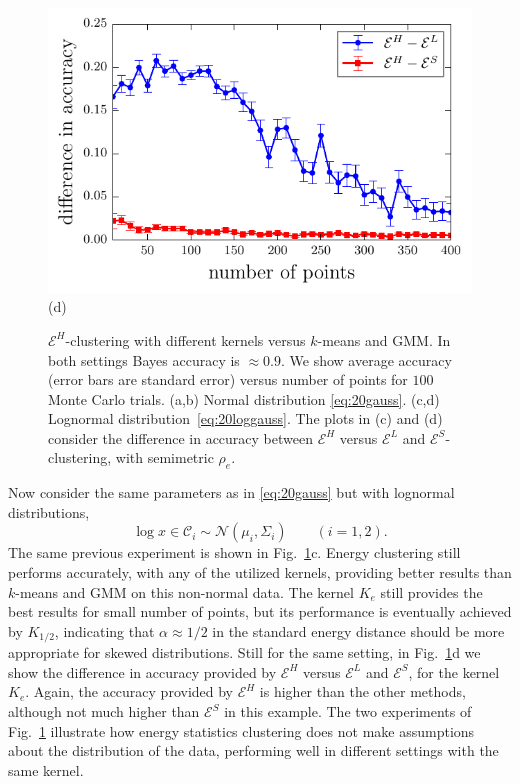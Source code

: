 \documentclass[aps,preprint,nofootinbib,floatfix]{revtex4-1}
\newcommand\kk{K}
\newcommand\C{{\mathcal{C}}}
\begin{document}
\begin{figure}
\begin{minipage}{0.49\textwidth}
\end{minipage}
\begin{minipage}{0.49\textwidth}
\centering
\includegraphics[width=1\textwidth]{lognormal_kernels_difference.pdf}\\[-1.0em]
(d)
\end{minipage}
\caption{
\label{fig:consist}
$\mathcal{E}^H$-clustering with different kernels versus
$k$-means and GMM. In both settings Bayes accuracy
is $\approx 0.9$. We show average accuracy (error bars are standard error)
versus number of points for $100$ Monte Carlo trials.
(a,b) Normal distribution \eqref{eq:20gauss}. 
(c,d) Lognormal distribution~\eqref{eq:20loggauss}.
The plots in (c) and (d) consider the difference in accuracy
between $\mathcal{E}^H$ versus $\mathcal{E}^L$ and
$\mathcal{E}^S$-clustering, with semimetric $\rho_e$.
}
\end{figure}

Now consider the same parameters as in \eqref{eq:20gauss} but with
lognormal distributions, 
\begin{equation}
\label{eq:20loggauss}
\log x \in \C_i \sim \mathcal{N}(\mu_i, \Sigma_i) \qquad (i=1,2).
\end{equation}
The same previous experiment is shown in 
Fig.~\ref{fig:consist}c.
Energy clustering still performs accurately, with any of the utilized
kernels, providing better results than $k$-means and GMM on
this non-normal data. The kernel $\kk_e$ still provides the best results
for small number of points, but its performance is eventually achieved by
$\kk_{1/2}$, indicating that $\alpha \approx 1/2$ in the standard
energy distance should be more appropriate for skewed distributions.
Still for the same setting, in Fig.~\ref{fig:consist}d
we show the difference in accuracy provided by $\mathcal{E}^H$ versus
$\mathcal{E}^L$ and $\mathcal{E}^S$, for the kernel $\kk_e$. Again,
the accuracy provided by $\mathcal{E}^H$ is higher than the other methods,
although not much higher than $\mathcal{E}^S$ in this example.
The two experiments of Fig.~\ref{fig:consist}
illustrate how energy statistics clustering does not make assumptions
about the distribution of the data, performing well in different settings
with the same kernel. 
\end{document}
